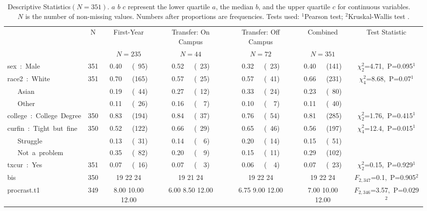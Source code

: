 \begin{table}[!tbp]
\caption{Descriptive Statistics$  (N=351)$. {\scriptsize $a$} $b$ {\scriptsize $c$} represent the lower quartile $a$, the median $b$, and the upper quartile $c$ for continuous variables. ~~ $N$ is the number of non-missing values. Numbers after proportions are frequencies. \indent Tests used: $^{1}$Pearson test; $^{2}$Kruskal-Wallis test .\label{t1}} 
\begin{center}
\begin{tabular}{lrccccc}
\hline\hline
\multicolumn{1}{l}{}&\multicolumn{1}{c}{N}&\multicolumn{1}{c}{First-Year}&\multicolumn{1}{c}{Transfer: On Campus}&\multicolumn{1}{c}{Transfer: Off Campus}&\multicolumn{1}{c}{Combined}&\multicolumn{1}{c}{Test Statistic}\tabularnewline
&&\multicolumn{1}{c}{{\scriptsize $N=235$}}&\multicolumn{1}{c}{{\scriptsize $N=44$}}&\multicolumn{1}{c}{{\scriptsize $N=72$}}&\multicolumn{1}{c}{{\scriptsize $N=351$}}&\tabularnewline
\hline
sex~:~Male&351&0.40~{\scriptsize~~(~95)}&0.52~{\scriptsize~~(~23)}&0.32~{\scriptsize~~(~23)}&0.40~{\scriptsize~~(141)}&$\chi^{2}_{2}$=4.71,~P=0.095$^{1}$\tabularnewline
race2~:~White&351&0.70~{\scriptsize~~(165)}&0.57~{\scriptsize~~(~25)}&0.57~{\scriptsize~~(~41)}&0.66~{\scriptsize~~(231)}&$\chi^{2}_{4}$=8.68,~P=0.07$^{1}$\tabularnewline
~~~Asian&&0.19~{\scriptsize~~(~44)}&0.27~{\scriptsize~~(~12)}&0.33~{\scriptsize~~(~24)}&0.23~{\scriptsize~~(~80)}&\tabularnewline
~~~Other&&0.11~{\scriptsize~~(~26)}&0.16~{\scriptsize~~(~~7)}&0.10~{\scriptsize~~(~~7)}&0.11~{\scriptsize~~(~40)}&\tabularnewline
college~:~College~Degree&350&0.83~{\scriptsize~~(194)}&0.84~{\scriptsize~~(~37)}&0.76~{\scriptsize~~(~54)}&0.81~{\scriptsize~~(285)}&$\chi^{2}_{2}$=1.76,~P=0.415$^{1}$\tabularnewline
curfin~:~Tight~but~fine&350&0.52~{\scriptsize~~(122)}&0.66~{\scriptsize~~(~29)}&0.65~{\scriptsize~~(~46)}&0.56~{\scriptsize~~(197)}&$\chi^{2}_{4}$=12.4,~P=0.015$^{1}$\tabularnewline
~~~Struggle&&0.13~{\scriptsize~~(~31)}&0.14~{\scriptsize~~(~~6)}&0.20~{\scriptsize~~(~14)}&0.15~{\scriptsize~~(~51)}&\tabularnewline
~~~Not~a~problem&&0.35~{\scriptsize~~(~82)}&0.20~{\scriptsize~~(~~9)}&0.15~{\scriptsize~~(~11)}&0.29~{\scriptsize~~(102)}&\tabularnewline
txcur~:~Yes&351&0.07~{\scriptsize~~(~16)}&0.07~{\scriptsize~~(~~3)}&0.06~{\scriptsize~~(~~4)}&0.07~{\scriptsize~~(~23)}&$\chi^{2}_{2}$=0.15,~P=0.929$^{1}$\tabularnewline
bis&350&{\scriptsize 19} 22 {\scriptsize 24}&{\scriptsize 19} 21 {\scriptsize 24}&{\scriptsize 19} 22 {\scriptsize 24}&{\scriptsize 19} 22 {\scriptsize 24}&$F_{2,347}$=0.1,~P=0.905$^{2}$\tabularnewline
procrast.t1&349&{\scriptsize  8.00} 10.00 {\scriptsize 12.00}&{\scriptsize  6.00}  8.50 {\scriptsize 12.00}&{\scriptsize  6.75}  9.00 {\scriptsize 12.00}&{\scriptsize  7.00} 10.00 {\scriptsize 12.00}&$F_{2,346}$=3.57,~P=0.029$^{2}$\tabularnewline
\hline
\end{tabular}\end{center}
\end{table}
